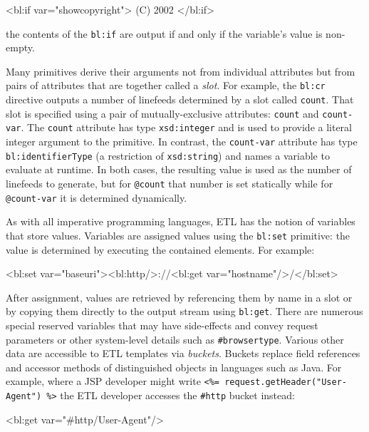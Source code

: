 \documentclass{www2003-submission}
\newcommand{\smtexttt}[1]{{\small\texttt{#1}}}
\newcommand{\etl}{ETL}
\newenvironment{smallverbatim}%
{\renewcommand{\baselinestretch}{1}\small\verbatim}%
{\renewcommand{\baselinestretch}{2}\endverbatim}
\begin{document}
\begin{smallverbatim}
<bl:if var="showcopyright"> (C) 2002 </bl:if>
\end{smallverbatim}

\noindent the contents of the \smtexttt{bl:if} are output if and
only if the variable's value is non-empty.

Many primitives derive their arguments not from individual attributes
but from pairs of attributes that are together called a \emph{slot}.
For example, the \smtexttt{bl:cr} directive outputs a number of
linefeeds determined by a slot called \smtexttt{count}.  That slot is
specified using a pair of mutually-exclusive attributes: \smtexttt{count} and
\smtexttt{count-var}.  The \smtexttt{count} attribute has type
\smtexttt{xsd:integer} and is used to provide a literal integer
argument to the primitive.  In contrast, the \smtexttt{count-var}
attribute has type \smtexttt{bl:identifierType} (a restriction of
\smtexttt{xsd:string}) and names a variable to evaluate at runtime.
In both cases, the resulting value is used as the number of linefeeds
to generate, but for \smtexttt{@count} that number is set statically
while for \smtexttt{@count-var} it is determined dynamically.

As with all imperative programming languages, \etl{} has the notion of
variables that store values. Variables are assigned values using the
\smtexttt{bl:set} primitive: the value is determined by executing the
contained elements. For example:

\begin{smallverbatim}
<bl:set var="baseuri"><bl:http/>://<bl:get
 var="hostname"/>/</bl:set>
\end{smallverbatim}

After assignment, values are retrieved by referencing them by name in
a slot or by copying them directly to the output stream using
\smtexttt{bl:get}.  There are numerous special reserved variables that may have
side-effects and convey request parameters
or other system-level details such as \smtexttt{\#browsertype}.
Various other data are accessible to \etl{} templates via
\emph{buckets}. Buckets replace field references and accessor methods of
distinguished objects in languages such as Java.  For example, where a
JSP developer might write \smtexttt{<\%= request.getHeader("User-Agent") \%>}
the \etl{} developer accesses the \smtexttt{\#http}
bucket instead:

\begin{smallverbatim}
<bl:get var="#http/User-Agent"/>
\end{smallverbatim}
\end{document}
